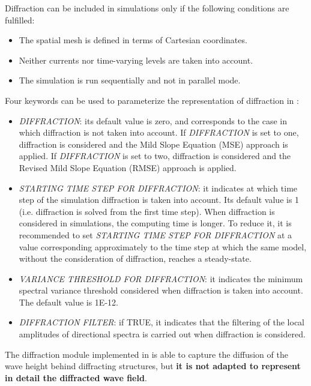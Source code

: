  Diffraction can be included in \tomawac simulations only if the following conditions are fulfilled:
\begin{itemize}

\item The spatial mesh is defined in terms of Cartesian coordinates.

 \item Neither currents nor time-varying levels are taken into account.

 \item The simulation is run sequentially and not in parallel mode.
\end{itemize}

Four keywords can be used to parameterize the representation of diffraction in \tomawac:

\begin{itemize}
\item  \textit{DIFFRACTION}: its default value is zero, and corresponds to the case in which diffraction is not taken into account.
  If \textit{DIFFRACTION} is set to one, diffraction is considered and the Mild Slope Equation (MSE) approach is applied. If
  \textit{DIFFRACTION} is set to two, diffraction is considered and the Revised Mild Slope Equation (RMSE) approach is applied.

\item  \textit{STARTING TIME STEP FOR DIFFRACTION}: it indicates at which time step of the simulation diffraction is taken into account.
  Its default value is 1 (i.e. diffraction is solved from the first time step). When diffraction is considered in \tomawac simulations,
  the computing time is longer. To reduce it, it is recommended to set \textit{STARTING TIME STEP FOR DIFFRACTION} at a value
  corresponding approximately to the time step at which the same \tomawac model, without the consideration of diffraction, reaches a
  steady-state.

\item  \textit{VARIANCE THRESHOLD FOR DIFFRACTION}: it indicates the minimum spectral variance threshold considered when diffraction is
  taken into account. The default value is 1E-12.

\item  \textit{DIFFRACTION FILTER}: if TRUE, it indicates that the filtering of the local amplitudes of directional spectra is carried
  out when diffraction is considered.
\end{itemize}

The diffraction module implemented in \tomawac is able to capture the diffusion of the wave height behind diffracting structures, but
\textbf{it is not adapted to represent in detail the diffracted wave field}.

